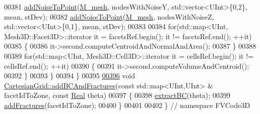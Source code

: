 \begin{DoxyCode}
00381         \hyperlink{namespaceFVCode3D_a9f604a7093f7f7323727e7ba28d8ce75}{addNoiseToPoint}(\hyperlink{classFVCode3D_1_1CartesianGrid_a40c64e663b3d2de02b852403c75495fb}{M\_mesh}, nodesWithNoiseY, std::vector<UInt>\{0,2\}, mean, stDev);
00382         \hyperlink{namespaceFVCode3D_a9f604a7093f7f7323727e7ba28d8ce75}{addNoiseToPoint}(\hyperlink{classFVCode3D_1_1CartesianGrid_a40c64e663b3d2de02b852403c75495fb}{M\_mesh}, nodesWithNoiseZ, std::vector<UInt>\{0,1\}, mean, stDev);
00383 
00384         \textcolor{keywordflow}{for}(std::map<UInt, Mesh3D::Facet3D>::iterator it = facetsRef.begin(); it != facetsRef.end(); ++it)
00385         \{
00386             it->second.computeCentroidAndNormalAndArea();
00387         \}
00388 
00389         \textcolor{keywordflow}{for}(std::map<UInt, Mesh3D::Cell3D>::iterator it = cellsRef.begin(); it != cellsRef.end(); ++it)
00390         \{
00391             it->second.computeVolumeAndCentroid();
00392         \}
00393     \}
00394 \}
00395 
\hypertarget{CartesianGrid_8cpp_source.tex_l00396}{}\hyperlink{classFVCode3D_1_1CartesianGrid_ac8dc7df2cf0ff329b495db228c58002b}{00396} \textcolor{keywordtype}{void} \hyperlink{classFVCode3D_1_1CartesianGrid_ac8dc7df2cf0ff329b495db228c58002b}{CartesianGrid::addBCAndFractures}(\textcolor{keyword}{const} std::map<UInt,UInt> & 
      facetIdToZone, \textcolor{keyword}{const} \hyperlink{namespaceFVCode3D_a40c1f5588a248569d80aa5f867080e83}{Real} theta)
00397 \{
00398     \hyperlink{classFVCode3D_1_1CartesianGrid_a8e96033c8f0f0f7b326bba2a87a20c41}{extractBC}(theta);
00399     \hyperlink{classFVCode3D_1_1CartesianGrid_ad331317a639d3441d6fa7707b78dfc67}{addFractures}(facetIdToZone);
00400 \}
00401 
00402 \} \textcolor{comment}{// namespace FVCode3D}
\end{DoxyCode}
